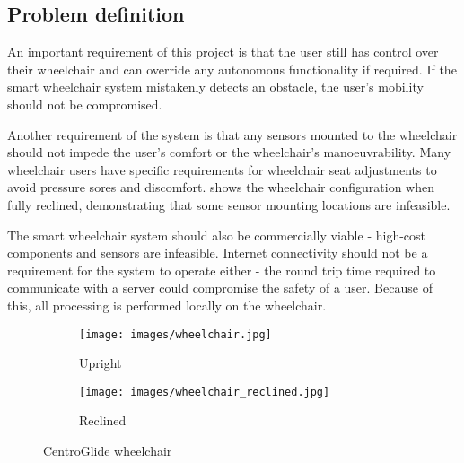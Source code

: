\pagebreak
\subsection{Problem definition}
An important requirement of this project is that the user still
has control over their wheelchair and can override any autonomous functionality
if required. If the smart wheelchair system mistakenly detects an obstacle,
the user's mobility should not be compromised.

Another requirement of the system is that any sensors mounted to the wheelchair
should not impede the user's comfort or the wheelchair's manoeuvrability.
Many wheelchair users have specific requirements for wheelchair seat adjustments
to avoid pressure sores and discomfort.  shows the
wheelchair configuration when fully reclined, demonstrating that some sensor mounting locations
are infeasible.

The smart wheelchair system should also be commercially viable - high-cost
components and sensors are infeasible. Internet connectivity should not be a requirement
for the system to operate either - the round trip time required to communicate with a server
could compromise the safety of a user. Because of this, all processing is performed locally
on the wheelchair.

\begin{figure}[b]
    \centering
    \begin{subfigure}{.45\textwidth}
        \centering
        \texttt{[image: images/wheelchair.jpg]}
        \caption{Upright}
    \end{subfigure}
    \quad
    \begin{subfigure}{.45\textwidth}
        \centering
        \texttt{[image: images/wheelchair\_reclined.jpg]}
        \caption{Reclined}
    \end{subfigure}
    \caption{CentroGlide wheelchair}
    \label{fig:wheelchair}
\end{figure}
